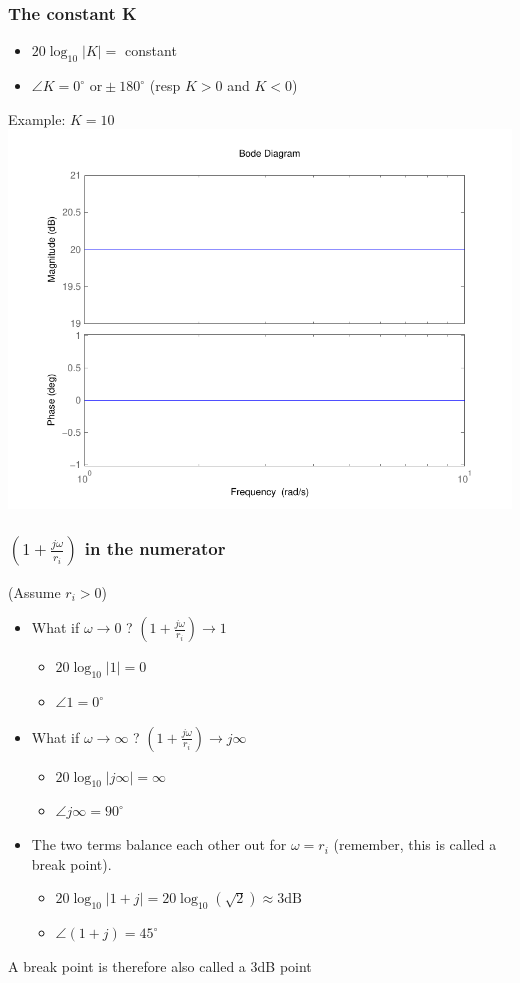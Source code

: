 \begin{frame}
\frametitle{The constant K}
\begin{itemize}
\item $20\log_{10}|K| =$ constant
\item $\angle K = 0^{\circ} \text{ or} \pm 180^{\circ}$  (resp $K > 0$ and $K < 0$)
\end{itemize}
Example: $K = 10$
\includegraphics[scale=0.45]{BodeConstant}

\end{frame}



\begin{frame}
\frametitle{$(1+\frac{j\omega}{r_i})$ in the numerator}
(Assume $r_i > 0$)
\begin{itemize}
\item What if $\omega \rightarrow 0$ ? \quad $(1+\frac{j\omega}{r_i}) \rightarrow 1$
\begin{itemize}
\item $20\log_{10}|1| = 0$
\item $\angle 1 = 0^{\circ}$
\end{itemize}

\item What if $\omega \rightarrow \infty$ ?  \quad  $(1+\frac{j\omega}{r_i}) \rightarrow j\infty$
\begin{itemize}
\item $20\log_{10}|j\infty| = \infty$
\item $\angle j\infty = 90^{\circ}$
\end{itemize}

\item The two terms balance each other out for $\omega = r_i$ (remember, this is called a break point).
\begin{itemize}
\item $20\log_{10}|1+j| = 20\log_{10}(\sqrt 2) \approx 3 \text{dB}$
\item $\angle(1+j) = 45^{\circ}$
\end{itemize}
\end{itemize}
A break point is therefore also called a 3dB point
\end{frame}



